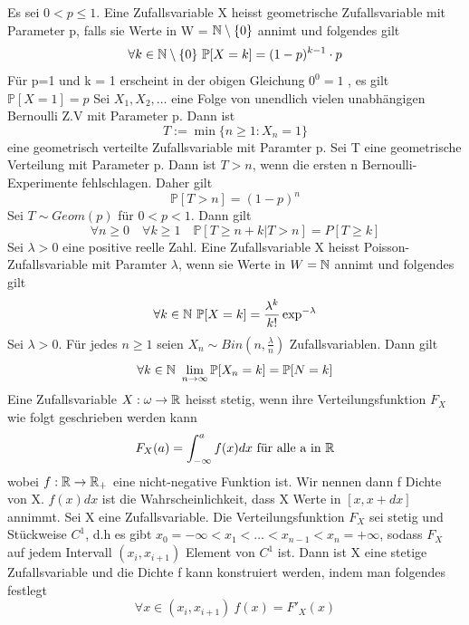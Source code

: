  \newline
Es sei \( 0 < p \leq 1\). Eine Zufallsvariable X heisst geometrische Zufallsvariable mit Parameter p, falls sie Werte in W = \( \mathbb{N} \setminus \{0\}\) annimt und folgendes gilt \[\forall k \in \N \setminus \{0\} \ \mathbb{P}[X=k] = (1-p)^{k-1} \cdot p\]
\Bem[3.16] \newline
Für p=1 und k = 1 erscheint in der obigen Gleichung \(0^0 = 1\) , es gilt \( \mathbb{P}[X=1] = p\)
\Satz[3.18] \newline
Sei \(X_1, X_2, \dots \) eine Folge von unendlich vielen unabhängigen Bernoulli Z.V mit Parameter p. Dann ist \[ T:= \min\{n \geq 1 : X_n = 1\}\] eine geometrisch verteilte Zufallsvariable mit Paramter p.
\Bem[3.18A] \newline
Sei T eine geometrische Verteilung mit Parameter p. Dann ist \( T > n\), wenn die ersten n Bernoulli-Experimente fehlschlagen. Daher gilt \[ \mathbb{P}[T > n] = (1-p)^n\]
 \newline
Sei \( T \sim Geom(p)\) für \( 0 < p < 1\). Dann gilt \[ \forall n \geq 0 \quad \forall k \geq 1 \quad \mathbb{P}[T \geq n + k | T > n] = P[T \geq k]\]
\Def[3.21] \newline
Sei \( \lambda > 0\) eine positive reelle Zahl. Eine Zufallsvariable X heisst Poisson-Zufallsvariable mit Paramter \( \lambda\), wenn sie Werte in \( W = \mathbb{N} \) annimt und folgendes gilt \[ \forall k \in \N \ \mathbb{P}[X = k] = \frac{\lambda^k}{k!}\exp^{-\lambda}\]
 \newline
Sei \( \lambda > 0\). Für jedes \( n \geq 1 \) seien \( X_n \sim Bin(n, \frac{\lambda}{n})\)  Zufallsvariablen. Dann gilt \[ \forall k \in \mathbb{N} \ \lim_{n \rightarrow \infty } \mathbb{P}[X_n = k] = \mathbb{P}[N =k]\]
 \newline
Eine Zufallsvariable \( X: \omega \rightarrow \mathbb{R} \) heisst stetig, wenn ihre Verteilungsfunktion \(F_X \) wie folgt geschrieben werden kann \[F_X(a) = \int_{-\infty}^{a} f(x)dx \ \text{für alle a in} \ \mathbb{R}\] wobei \(f: \mathbb{R} \rightarrow \mathbb{R}_+\) eine nicht-negative Funktion ist. Wir nennen dann f Dichte von X.
\Bem[3.25A] \newline
\(f(x)dx \) ist die Wahrscheinlichkeit, dass X Werte in \( [x, x+ dx]\) annimmt.
\Theo[3.26] \newline
Sei X eine Zufallsvariable. Die Verteilungsfunktion \(F_X\) sei stetig und Stückweise \( C^1\), d.h es gibt \(x_0 = -\infty < x_1 < \dots < x_{n-1} < x_n = + \infty\), sodass \(F_X\) auf jedem Intervall \( (x_i, x_{i+1})\) Element von \(C^1\) ist. Dann ist X eine stetige Zufallsvariable und die Dichte f kann konstruiert werden, indem man folgendes festlegt \[ \forall x \in (x_i, x_{i+1}) \ f(x) = F'_X(x)\]
